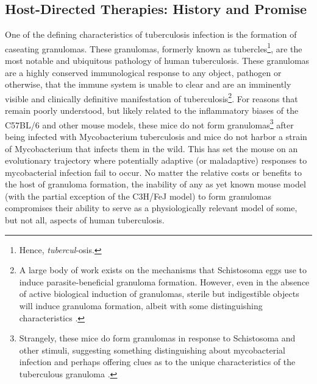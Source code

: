 \subsection{Host\hyp{}Directed Therapies: History and Promise}\label{hdt}

One of the defining characteristics of tuberculosis infection is the formation of caseating granulomas. These granulomas, formerly known as tubercles\footnote{Hence, \textit{tubercul}\hyp{}osis.}, are the most notable and ubiquitous pathology of human tuberculosis. These granulomas are a highly conserved immunological response to any object, pathogen or otherwise, that the immune system is unable to clear and are an imminently visible and clinically definitive manifestation of tuberculosis\footnote{A large body of work exists on the mechanisms that Schistosoma eggs use to induce parasite\hyp{}beneficial granuloma formation. However, even in the absence of active biological induction of granulomas, sterile but indigestible objects will induce granuloma formation, albeit with some distinguishing characteristics \citep{Boros2003}.}. For reasons that remain poorly understood, but likely related to the inflammatory biases of the C57BL/6 and other mouse models, these mice do not form granulomas\footnote{Strangely, these mice do form granulomas in response to Schistosoma and other stimuli, suggesting something distinguishing about mycobacterial infection and perhaps offering clues as to the unique characteristics of the tuberculous granuloma \citep{Fu2012}.} after being infected with Mycobacterium tuberculosis and mice do not harbor a strain of Mycobacterium that infects them in the wild. This has set the mouse on an evolutionary trajectory where potentially adaptive (or maladaptive) responses to mycobacterial infection fail to occur. No matter the relative costs or benefits to the host of granuloma formation, the inability of any as yet known mouse model (with the partial exception of the C3H/FeJ model) to form granulomas compromises their ability to serve as a physiologically relevant model of some, but not all, aspects of human tuberculosis.

